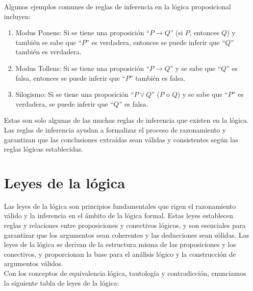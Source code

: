 Algunos ejemplos comunes de reglas de inferencia en la lógica proposicional incluyen:

\begin{enumerate}
    \item Modus Ponens: Si se tiene una proposición “$P \rightarrow Q$” (si $P$, entonces $Q$) y también se sabe que “$P$” es verdadera, entonces se puede inferir que “$Q$” también es verdadera.
    \item Modus Tollens: Si se tiene una proposición “$P \rightarrow Q$” y se sabe que “$Q$” es falsa, entonces se puede inferir que “$P$” también es falsa.
    \item Silogismo: Si se tiene una proposición “$P \lor Q$” ($P$ o $Q$) y se sabe que “$P$” es verdadera, se puede inferir que “$Q$” es falsa.
\end{enumerate}

Estas son solo algunas de las muchas reglas de inferencia que existen en la lógica. Las reglas de inferencia ayudan a formalizar el proceso de razonamiento y garantizan que las conclusiones extraídas sean válidas y consistentes según las reglas lógicas establecidas.

\newpage

\section{Leyes de la lógica}

Las leyes de la lógica son principios fundamentales que rigen el razonamiento válido y la inferencia en el ámbito de la lógica formal. Estas leyes establecen reglas y relaciones entre proposiciones y conectivos lógicos, y son esenciales para garantizar que los argumentos sean coherentes y las deducciones sean sólidas. Las leyes de la lógica se derivan de la estructura misma de las proposiciones y los conectivos, y proporcionan la base para el análisis lógico y la construcción de argumentos válidos.\\


Con los conceptos de equivalencia lógica, tautología y contradicción, enunciamos la siguiente tabla de leyes de la lógica:


